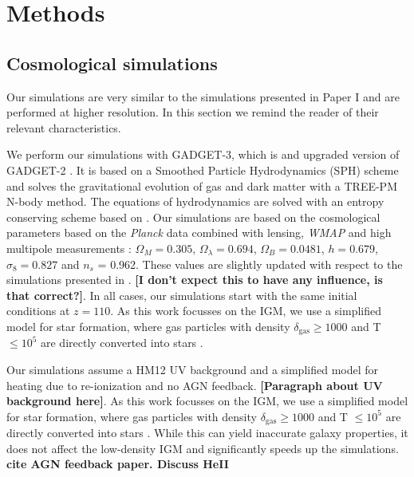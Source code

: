 \documentclass[numberedappendix]{emulateapj}
\newcommand\ALc[1]{{\color{red} \bf #1}} %
\begin{document}
\section{Methods}\label{sec:sims}

\subsection{Cosmological simulations}
Our simulations are very similar to the simulations presented in Paper I and are performed at higher resolution. In this section we remind the reader of their relevant characteristics. 

We perform our simulations with \textsc{GADGET-3}, which is and upgraded version of \textsc{GADGET-2} \citep{2005MNRAS.364.1105S}.  It is based on a Smoothed Particle Hydrodynamics (SPH) scheme and solves the gravitational evolution of gas and dark matter with a TREE-PM N-body method.  The equations of hydrodynamics are solved with an entropy conserving scheme based on \citep{2002MNRAS.333..649S}.   Our simulations are based on the cosmological parameters based on  the \textit{Planck} data combined with lensing, \textit{WMAP} and high multipole measurements \citep{2014A&A...571A..16P}: $\Omega_M = 0.305$, $\Omega_{\lambda} = 0.694$, $\Omega_B = 0.0481$, $h = 0.679$, $\sigma_8 = 0.827$ and $n_s$ = 0.962.  These values are slightly updated with respect to the simulations presented in \citep{2012MNRAS.423..149P,2015ApJ...811...19L}. \ALc{[I don't expect this to have any influence, is that correct?]}. In all cases, our simulations start with the same initial conditions at $z=110$. As this work focusses on the IGM, we use a simplified model for star formation, where gas particles with  density $\delta_{\mathrm{gas}}\geq 1000$ and T $\leq 10^5$ are directly converted into stars \citep{2004MNRAS.354..684V}. 



Our simulations assume a HM12 UV background and a simplified model for heating due to re-ionization and no AGN feedback. \ALc{[Paragraph about UV  background here]}. As this work focusses on the IGM, we use a simplified model for star formation, where gas particles with  density $\delta_{\mathrm{gas}}\geq 1000$ and T $\leq 10^5$ are directly converted into stars \citep{2004MNRAS.354..684V}. While this can yield inaccurate galaxy properties, it does not affect the low-density IGM and significantly speeds up the simulations. \ALc{cite AGN feedback paper. Discuss HeII}
\end{document}
